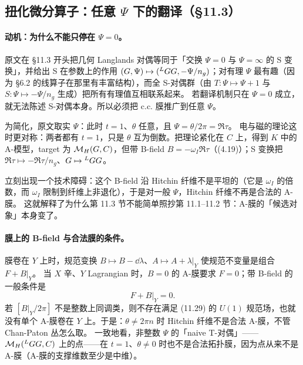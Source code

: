 \subsection{扭化微分算子：任意 \texorpdfstring{\(\Psi\)}{Psi} 下的翻译（\S11.3）}
\label{subsec:twist}

\paragraph{动机：为什么不能只停在 \(\Psi=0\)。}原文在 \S11.3 开头把几何 Langlands 对偶等同于「交换 \(\Psi=0\) 与 \(\Psi=\infty\) 的 S 变换」，并给出 S 在参数上的作用 \((G,\Psi)\mapsto({}^{L}G G,-\Psi/n_g)\)；对有理 \(\Psi\) 最有趣（因为 \S6.2 的线算子在那里有丰富结构），而全 S-对偶群（由 \(T:\Psi\mapsto\Psi+1\) 与 \(S:\Psi\mapsto-\Psi/n_g\) 生成）把所有有理值互相联系起来。\pA{} 若翻译机制只在 \(\Psi=0\) 成立，就无法陈述 S-对偶本身。所以必须把 c.c. 膜推广到任意 \(\Psi\)。

为简化，原文取实 \(\Psi\)：此时 \(t=1\)、\(\theta\) 任意，且 \(\Psi=\theta/2\pi=\Re\tau\)。\pA{} 电与磁的理论这时更对称：两者都有 \(t=1\)，只是 \(\theta\) 互为倒数。把理论紧化在 \(C\) 上，得到 \(K\) 中的 A-模型，target 为 \(\mathcal{M}_H(G,C)\)，但带 B-field \(B=-\omega_I\Re\tau\)（(4.19)）；S 变换把 \(\Re\tau\mapsto-\Re\tau/n_g\)、\(G\mapsto{}^{L}G G\)。\pA{}

立刻出现一个技术障碍：这个 B-field 沿 Hitchin 纤维不是平坦的（它是 \(\omega_I\) 的倍数，而 \(\omega_I\) 限制到纤维上非退化），于是对一般 \(\Psi\)，Hitchin 纤维不再是合法的 A-膜。\pA{} 这就解释了为什么第 11.3 节不能简单照抄第 11.1--11.2 节：A-膜的「候选对象」本身变了。

\paragraph{膜上的 B-field 与合法膜的条件。}膜卷在 \(Y\) 上时，规范变换 \(B\mapsto B-\dd\lambda\)、\(A\mapsto A+\lambda|_Y\) 使规范不变量是组合 \(F+B|_Y\)。\pA{} 当 \(X\) 辛、\(Y\) Lagrangian 时，\(B=0\) 的 A-膜要求 \(F=0\)；带 B-field 的一般条件是
\begin{equation}
F+B|_Y=0 .
\label{eq:F-plus-B}
\end{equation}
\pA{} 若 \([B|_Y/2\pi]\) 不是整数上同调类，则不存在满足 (11.29) 的 \(U(1)\) 规范场，也就没有单个 A-膜卷在 \(Y\) 上。于是：\(\theta\neq2\pi n\) 时 Hitchin 纤维不是合法 A-膜，不管 Chan-Paton 丛怎么取。\pA{} 一致地看，非整数 \(\Psi\) 的「naive T-对偶」——\(\mathcal{M}_H({}^{L}G G,C)\) 上的点——在 \(t=1\)、\(\theta\neq0\) 时也不是合法拓扑膜，因为点从来不是 A-膜（A-膜的支撑维数至少是中维）。\pA{}

